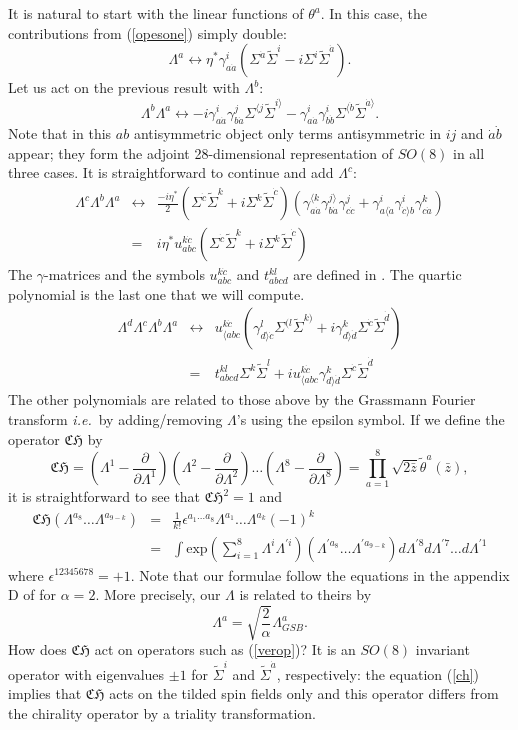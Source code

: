 \documentclass[nohyper,12pt,letterpaper]{JHEP3}
\def \tilde{\widetilde}
\def \lr{\leftrightarrow}
\def \exp{\mbox{exp}}
\def \eqn#1#2{\begin{equation}#2\label{#1}\end{equation}}
\def \da{{\dot a}}
\def \db{{\dot b}}
\def \dc{{\dot c}}
\def \dd{{\dot d}}
\def \CH{\mathfrak {CH}}
\def \ttheta{{\tilde \theta}}
\def \tSigma{{\tilde \Sigma}}
\def\p{\partial }
\begin{document}
It is natural to start with the linear functions of 
$\theta^a$. In this case, the contributions from (\ref{opesone}) simply 
double:
\eqn{linear}{\Lambda^a \lr \eta^*\gamma^i_{a\da}(\Sigma^\da\tSigma^i
-i\Sigma^i\tSigma^\da).}
Let us act on the previous result with $\Lambda^b$:
\eqn{bilin}{\Lambda^b\Lambda^a\lr
-i\gamma^i_{a\da}\gamma^{j}_{b\da}\Sigma^{\langle j}\tSigma^{i\rangle}
-\gamma^i_{a\da}\gamma^i_{b\db}\Sigma^{\langle 
\db}\tSigma^{\da\rangle}.}
Note that in this $ab$ antisymmetric object
only terms antisymmetric in $ij$ and $\da\db$ appear; they form the 
adjoint 28-dimensional representation of $SO(8)$ in all three cases.
It is straightforward to continue and add $\Lambda^c$:
\eqn{cubic}{\begin{array}{rcl}\Lambda^c\Lambda^b\Lambda^a&\lr&
\frac{-i\eta^*}2\left(
\Sigma^\dc\tSigma^k
+i\Sigma^k\tSigma^\dc
\right)
\left(
\gamma^{\langle k}_{a\da}\gamma^{j\rangle}_{b\da}\gamma^j_{c\dc}
+\gamma^i_{a\langle\da}\gamma^i_{\dc\rangle b}\gamma^k_{c\da}
\right)\\
\quad&=&i\eta^* u^{k\dc}_{abc}\left(
\Sigma^\dc\tSigma^k
+i\Sigma^k\tSigma^\dc
\right)\end{array}
}
The $\gamma$-matrices and the symbols
$u^{k\dc}_{abc}$ and $t^{kl}_{abcd}$ are defined in \cite{brinkgs}.
The quartic polynomial is the last one that we will compute.
\eqn{kvartik}{\begin{array}{rcl}\Lambda^d\Lambda^c\Lambda^b\Lambda^a&\lr&
u^{k\dc}_{\langle abc}
\left(\gamma^{l}_{d\rangle\dc}\Sigma^{(l}\tSigma^{k)}
+i\gamma^k_{d\rangle\dd}\Sigma^\dc\tSigma^\dd
\right)\\
\,&=&t^{kl}_{abcd}\Sigma^k\tSigma^l+i u^{k\dc}_{\langle abc}\gamma^k_{d\rangle\dd}
\Sigma^{\dc}\tSigma^\dd
\end{array}}
The other polynomials are related to those above by the Grassmann
Fourier transform {\it i.e.}\ by adding/removing $\Lambda$'s using the 
epsilon symbol. If we define the operator $\CH$ by
\eqn{ch}{\CH=\left(\Lambda^1-\frac{\p}{\p\Lambda^1}\right)
\left(\Lambda^2-\frac{\p}{\p\Lambda^2}\right)\dots
\left(\Lambda^8-\frac{\p}{\p\Lambda^8}\right)=\prod_{a=1}^8 \sqrt{2\bar z
}\ttheta^a(\bar z),}
it is straightforward to see that $\CH^2=1$ and
\eqn{hodgech}{\begin{array}{rcl}
\CH(\Lambda^{a_8}\dots \Lambda^{a_{9-k}})
&=&\frac{1}{k!}\epsilon^{a_1\dots a_8}\Lambda^{a_1}\dots\Lambda^{a_k}(-1)^k\\
\,&=&
\int
\exp\left(
\sum_{i=1}^8 \Lambda^{i}\Lambda^{\prime i}
\right)
(\Lambda^{\prime a_8}\dots \Lambda^{\prime a_{9-k}})
d\Lambda^{\prime 8} d\Lambda^{\prime 7}\dots d\Lambda^{\prime 1}
\end{array}
}
where $\epsilon^{12345678}=+1$. Note that our formulae follow the equations
in the appendix D of \cite{brinkgs} for $\alpha=2$. More precisely, our $\Lambda$
is related to theirs by
\eqn{vztah}{\Lambda^a = \sqrt{\frac 2\alpha} \Lambda^a_{GSB}.}
How does $\CH$ act on 
operators such as (\ref{verop})? It is an $SO(8)$ invariant operator
with eigenvalues $\pm1$ for $\tSigma^i$ and $\tSigma^\da$, respectively: the equation
(\ref{ch}) implies that $\CH$ acts on the tilded spin fields only and this
operator differs from the chirality operator by a triality transformation.
\end{document}
